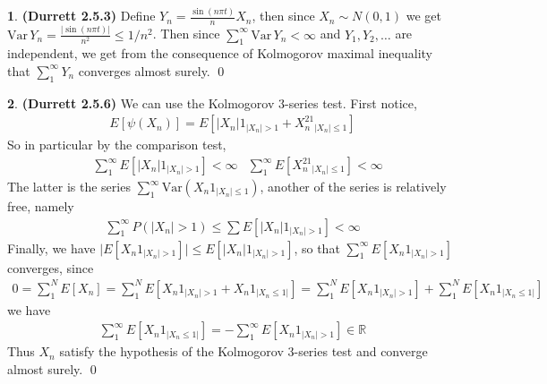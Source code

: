 \documentclass[10.5pt]{article}
\theoremstyle{definition}
\newtheorem{pb}{}
\newcommand{\abs}[1]{\lvert#1\rvert}
\newcommand{\var}{\text{Var}}
\begin{document}
    \begin{pb}\textbf{(Durrett 2.5.3)}
        Define \(Y_n = \frac{\sin(n\pi t)}{n}X_n\), then since \(X_n \sim N(0,1)\) we get \(\var\, Y_n = \frac{\abs{\sin(n\pi t)}}{n^2} \leq 1/n^2\). Then since \(\sum_1^\infty \text{Var}\,Y_n < \infty\) and \(Y_1,Y_2,\hdots\) are independent, we get from the consequence of Kolmogorov maximal inequality that \(\sum_1^\infty Y_n\) converges almost surely. \qed
    \end{pb}
    \begin{pb}\textbf{(Durrett 2.5.6)}
        We can use the Kolmogorov \(3\)-series test. First notice,
        \begin{align*}
            E[\psi(X_n)] = E\left[\abs{X_n}1_{\abs{X_n} > 1} + X_n^21_{\abs{X_n} \leq 1}\right]
        \end{align*}
        So in particular by the comparison test,
        \begin{align*}
            & \sum_1^\infty E\left[\abs{X_n}1_{\abs{X_n} > 1}\right] < \infty &\sum_1^\infty E\left[X_n^21_{\abs{X_n} \leq 1}\right] < \infty
        \end{align*}
        The latter is the series \(\sum_1^\infty \var(X_n1_{\abs{X_n} \leq 1})\), another of the series is relatively free, namely
        \begin{align*}
            \sum_1^\infty P(\abs{X_n} > 1) \leq \sum E\left[\abs{X_n}1_{\abs{X_n}>1}\right] < \infty
        \end{align*}
        Finally, we have \(\abs{E[X_n1_{\abs{X_n} > 1}]} \leq E\left[\abs{X_n}1_{\abs{X_n} > 1}\right]\), so that \(\sum_1^\infty E\left[X_n1_{\abs{X_n} > 1}\right]\) converges, since
        \begin{align*}
            0 = \sum_1^N E\left[X_n\right] = \sum_1^N E\left[X_n1_{\abs{X_n} > 1} + X_n1_{\abs{X_n \leq 1}}\right] = \sum_1^N E\left[X_n1_{\abs{X_n} > 1}\right] + \sum_1^N E\left[X_n1_{\abs{X_n \leq 1}}\right]
        \end{align*}
        we have
        \begin{align*}
            \sum_1^\infty E\left[X_n1_{\abs{X_n \leq 1}}\right] = - \sum_1^\infty E\left[X_n1_{\abs{X_n} > 1}\right] \in \mathbb{R}
        \end{align*}
        Thus \(X_n\) satisfy the hypothesis of the Kolmogorov \(3\)-series test and converge almost surely. \qed
    \end{pb}
\end{document}
